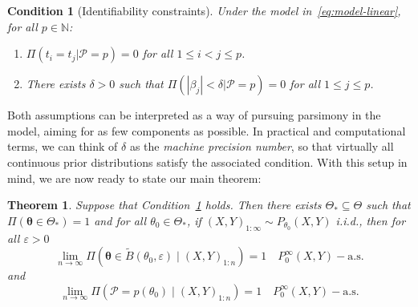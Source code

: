 \documentclass{article}
\numberwithin{equation}{section}
\theoremstyle{plain}
\newtheorem{theorem}{Theorem}[section]
\newtheorem{condition}{Condition}[section]
\renewcommand{\epsilon}{\varepsilon}
\newcommand{\N}{\mathbb{N}}
\begin{document}
\begin{condition}[Identifiability constraints] Under the model in~\eqref{eq:model-linear}, for all \(p\in\N\):\label{cond:condition-ident}
  \begin{enumerate}
    \item \(\Pi(t_i=t_j|\mathcal P=p)=0\) for all \(1\leq i < j \leq p\).\label{cond:condition-ident-1}
    \item There exists \(\delta>0\) such that \(\Pi(|\beta_j|<\delta|\mathcal P=p)=0\) for all \(1\leq j \leq p\).\label{cond:condition-ident-2}
  \end{enumerate}
\end{condition}

Both assumptions can be interpreted as a way of pursuing parsimony in the model, aiming for as few components as possible. In practical and computational terms, we can think of \(\delta\) as the \textit{machine precision number}, so that virtually all continuous prior distributions satisfy the associated condition. With this setup in mind, we are now ready to state our main theorem:

\begin{theorem}\label{th:consistency-theorem}
  Suppose that Condition~\ref{cond:condition-ident} holds. Then there exists \(\Theta_*\subseteq \Theta\) such that \(\Pi(\bm\theta \in \Theta_*)=1\) and for all \(\theta_0\in\Theta_*\), if \((X,Y)_{1:\infty} \sim P_{\theta_0}(X,Y)\) i.i.d., then for all \(\epsilon > 0\)
  \[
    \lim_{n\to\infty} \Pi(\bm \theta \in \tilde{B}(\theta_0,\epsilon) \mid (X,Y)_{1:n}) = 1 \quad P_{0}^\infty(X,Y)-\text{a.s.}
  \]
  and
  \[
    \lim_{n\to\infty} \Pi(\mathcal P=p(\theta_0) \mid (X,Y)_{1:n}) = 1 \quad P_{0}^\infty(X,Y)-\text{a.s.}
  \]
\end{theorem}
\end{document}
